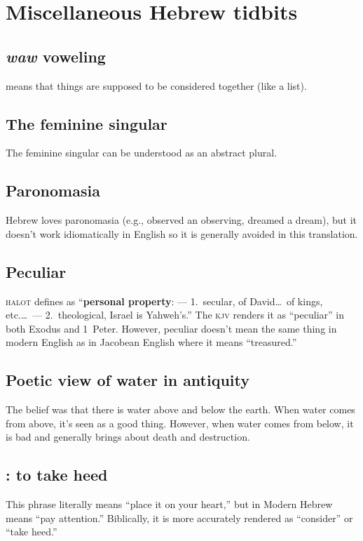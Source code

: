 \section{Miscellaneous Hebrew tidbits}\label{app:misc-heb}
\subsection{\textit{waw} voweling}\label{app:waw-voweling}
 means that things are supposed to be considered together (like a list).

\subsection{The feminine singular}
The feminine singular can be understood as an abstract plural.

\subsection{Paronomasia}\label{app:paronomasia}
Hebrew loves paronomasia (e.g., observed an observing, dreamed a dream), but it doesn't work idiomatically in English so it is generally avoided in this translation.

\subsection{Peculiar}\label{app:peculiar}
\textsc{halot} defines  as ``\textbf{personal property}: --- 1.\ secular, of David\dots\ of kings, etc.\dots\ --- 2.\ theological, Israel is Yahweh's.'' The \textsc{kjv} renders it as ``peculiar'' in both Exodus and 1~Peter. However, peculiar doesn't mean the same thing in modern English as in Jacobean English where it means ``treasured.''

\subsection{Poetic view of water in antiquity}\label{app:water-in-antiquity}
The belief was that there is water above and below the earth. When water comes from above, it's seen as a good thing. However, when water comes from below, it is bad and generally brings about death and destruction.

\subsection{ : to take heed}
This phrase literally means ``place it on your heart,'' but in Modern Hebrew means ``pay attention.'' Biblically, it is more accurately rendered as ``consider'' or ``take heed.''
